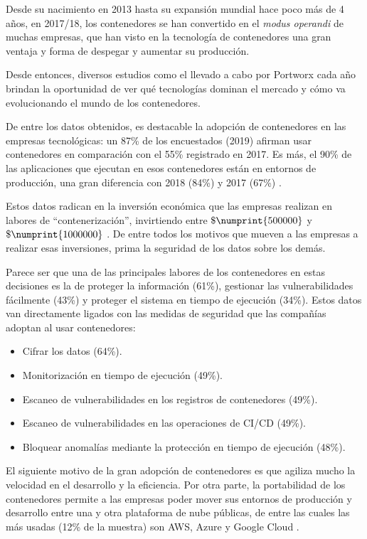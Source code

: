 Desde su nacimiento en 2013 hasta su expansión mundial hace poco más de 4 años, en
2017/18, los contenedores se han convertido en el \textit{modus operandi}
de muchas empresas, que han visto en la tecnología de contenedores una gran ventaja
y forma de despegar y aumentar su producción.

Desde entonces, diversos estudios como el llevado a cabo por Portworx cada año brindan
la oportunidad de ver qué tecnologías dominan el mercado y cómo va evolucionando el
mundo de los contenedores.

De entre los datos obtenidos, es destacable la adopción de contenedores en las
empresas tecnológicas: un 87\% de los encuestados (2019) afirman usar contenedores en
comparación con el 55\% registrado en 2017. Es más, el 90\% de las aplicaciones que
ejecutan en esos contenedores están en entornos de producción, una gran diferencia con
2018 (84\%) y 2017 (67\%) \cite{wattsStateContainersToday}.

Estos datos radican en la inversión económica que las empresas realizan en labores
de ``contenerización'', invirtiendo entre $\$\numprint{500000}$ y $\$\numprint{1000000}$
\cite{wattsStateContainersToday}. De entre todos los motivos que mueven a las empresas
a realizar esas inversiones, prima la seguridad de los datos sobre los demás.

Parece ser que una de las principales labores de los contenedores en estas decisiones
es la de proteger la información (61\%), gestionar las vulnerabilidades fácilmente
(43\%) y proteger el sistema en tiempo de ejecución (34\%). Estos datos van directamente
ligados con las medidas de seguridad que las compañías adoptan al usar contenedores:

\begin{itemize}
    \item Cifrar los datos (64\%).
    \item Monitorización en tiempo de ejecución (49\%).
    \item Escaneo de vulnerabilidades en los registros de contenedores (49\%).
    \item Escaneo de vulnerabilidades en las operaciones de CI/CD (49\%).
    \item Bloquear anomalías mediante la protección en tiempo de ejecución (48\%).
\end{itemize}

El siguiente motivo de la gran adopción de contenedores es que agiliza mucho la
velocidad en el desarrollo y la eficiencia. Por otra parte, la portabilidad de los
contenedores permite a las empresas poder mover sus entornos de producción y
desarrollo entre una y otra plataforma de nube públicas, de entre las cuales las
más usadas (12\% de la muestra) son AWS, Azure y Google Cloud \cite{wattsStateContainersToday}.

